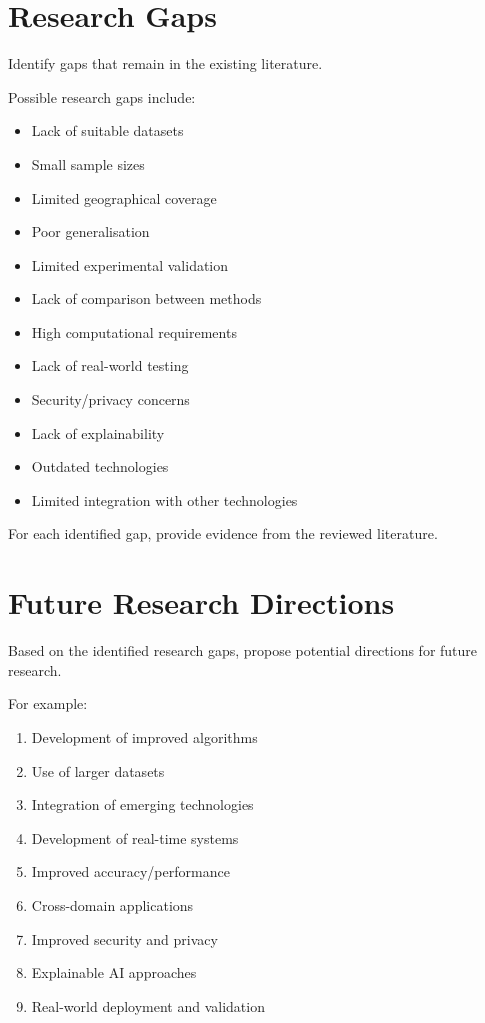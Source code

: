 \documentclass[12pt,a4paper]{article}
\begin{document}

\section{Research Gaps}

Identify gaps that remain in the existing literature.

Possible research gaps include:

\begin{itemize}
    \item Lack of suitable datasets
    \item Small sample sizes
    \item Limited geographical coverage
    \item Poor generalisation
    \item Limited experimental validation
    \item Lack of comparison between methods
    \item High computational requirements
    \item Lack of real-world testing
    \item Security/privacy concerns
    \item Lack of explainability
    \item Outdated technologies
    \item Limited integration with other technologies
\end{itemize}

For each identified gap, provide evidence from the reviewed literature.



\section{Future Research Directions}

Based on the identified research gaps, propose potential directions for future research.

For example:

\begin{enumerate}
    \item Development of improved algorithms
    \item Use of larger datasets
    \item Integration of emerging technologies
    \item Development of real-time systems
    \item Improved accuracy/performance
    \item Cross-domain applications
    \item Improved security and privacy
    \item Explainable AI approaches
    \item Real-world deployment and validation
\end{enumerate}
\end{document}
